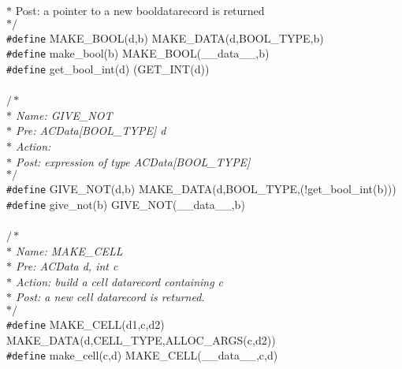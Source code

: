 \begin{flushleft}
{\hspace*{1\indentation}$\ast$ Post: a pointer to a new booldatarecord is returned\mbox{}\\
\hspace*{1\indentation}$\ast/$}\mbox{}\\
{\tt \#define} MAKE\_BOOL(d,b) MAKE\_DATA(d,BOOL\_TYPE,b)\mbox{}\\
{\tt \#define} make\_bool(b) MAKE\_BOOL(\_\_data\_\_,b)\mbox{}\\
{\tt \#define} get\_bool\_int(d) (GET\_INT(d))\mbox{}\\
\mbox{}\\
{$/\ast$\it{}\mbox{}\\
\hspace*{1\indentation}$\ast$ Name: GIVE\_NOT\mbox{}\\
\hspace*{1\indentation}$\ast$ Pre: ACData[BOOL\_TYPE] d\mbox{}\\
\hspace*{1\indentation}$\ast$ Action: \mbox{}\\
\hspace*{1\indentation}$\ast$ Post: expression of type ACData[BOOL\_TYPE]\mbox{}\\
\hspace*{1\indentation}$\ast/$}\mbox{}\\
{\tt \#define} GIVE\_NOT(d,b) MAKE\_DATA(d,BOOL\_TYPE,(!get\_bool\_int(b)))\mbox{}\\
{\tt \#define} give\_not(b) GIVE\_NOT(\_\_data\_\_,b)\mbox{}\\
\mbox{}\\
{$/\ast$\it{}\mbox{}\\
\hspace*{1\indentation}$\ast$ Name: MAKE\_CELL\mbox{}\\
\hspace*{1\indentation}$\ast$ Pre: ACData d, int c\mbox{}\\
\hspace*{1\indentation}$\ast$ Action: build a cell datarecord containing c\mbox{}\\
\hspace*{1\indentation}$\ast$ Post: a new cell datarecord is returned.\mbox{}\\
\hspace*{1\indentation}$\ast/$}\mbox{}\\
{\tt \#define} MAKE\_CELL(d1,c,d2) MAKE\_DATA(d,CELL\_TYPE,ALLOC\_ARGS(c,d2))\mbox{}\\
{\tt \#define} make\_cell(c,d) MAKE\_CELL(\_\_data\_\_,c,d)\mbox{}\\

\end{flushleft}
